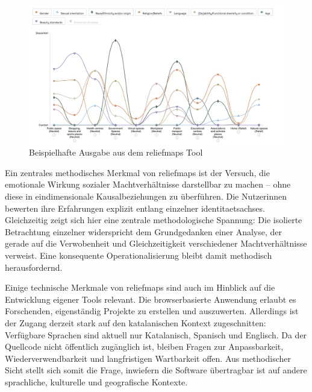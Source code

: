 \begin{figure}[htbp]
    \centering
    \includegraphics[width=\textwidth]{Arbeit/Bilder/reliefmap.png}
    \caption{Beispielhafte Ausgabe aus dem \gls{reliefmaps} Tool}
    \label{fig:relief_maps_plus_screenshot_1}
\end{figure}

Ein zentrales methodisches Merkmal von \gls{reliefmaps} ist der Versuch, die emotionale Wirkung sozialer Machtverhältnisse darstellbar zu machen -- ohne diese in eindimensionale Kausalbeziehungen zu überführen. Die Nutzer\genderstern innen bewerten ihre Erfahrungen explizit entlang einzelner \glspl{identitaetsachse}. Gleichzeitig zeigt sich hier eine zentrale methodologische Spannung: Die isolierte Betrachtung einzelner  widerspricht dem Grundgedanken einer  Analyse, der gerade auf die Verwobenheit und Gleichzeitigkeit verschiedener Machtverhältnisse verweist. Eine konsequente  Operationalisierung bleibt damit methodisch herausfordernd.

Einige technische Merkmale von \gls{reliefmaps} sind auch im Hinblick auf die Entwicklung eigener Tools relevant. Die browserbasierte Anwendung erlaubt es Forschenden, eigenständig Projekte zu erstellen und auszuwerten. Allerdings ist der Zugang derzeit stark auf den katalanischen Kontext zugeschnitten: Verfügbare Sprachen sind aktuell nur Katalanisch, Spanisch und Englisch. Da der Quellcode nicht öffentlich zugänglich ist, bleiben Fragen zur Anpassbarkeit, Wiederverwendbarkeit und langfristigen Wartbarkeit offen. Aus methodischer Sicht stellt sich somit die Frage, inwiefern die Software übertragbar ist auf andere sprachliche, kulturelle und geografische Kontexte.

